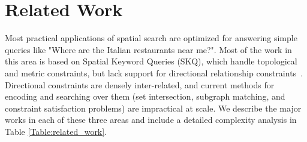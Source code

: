 \section{Related Work}
\label{section:related}

\par{
    Most practical applications of spatial search are optimized for answering simple queries like "Where are the Italian restaurants near me?".
    Most of the work in this area is based on Spatial Keyword Queries (SKQ), which handle topological and metric constraints, but lack support for directional relationship constraints~\cite{Guo2015, Cao2012, Zhang2009, Osul2023}. 
    Directional constraints are densely inter-related, and current methods for encoding and searching over them (set intersection, subgraph matching, and constraint satisfaction problems) are impractical at scale.
    We describe the major works in each of these three areas and include a detailed complexity analysis in Table \ref{Table:related_work}.
}


    





